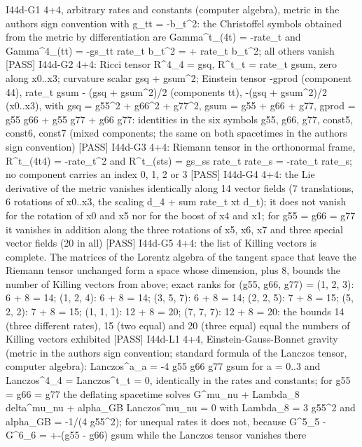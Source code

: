 \documentclass[
  10pt,
]{article}
\newenvironment{Shaded}{}{}
\newcommand{\NormalTok}[1]{#1}
\begin{document}
\begin{Shaded}
\begin{Highlighting}[]
\NormalTok{[PASS] I44d{-}G1  4+4, arbitrary rates and constants (computer algebra), metric in the author\textquotesingle{}s sign convention with g\_tt = {-}b\_t\^{}2: the Christoffel symbols obtained from the metric by differentiation are Gamma\^{}t\_(4t) = {-}rate\_t and Gamma\^{}4\_(tt) = {-}gs\_tt rate\_t b\_t\^{}2 = + rate\_t b\_t\^{}2; all others vanish}
\NormalTok{[PASS] I44d{-}G2  4+4: Ricci tensor R\^{}4\_4 = gsq, R\^{}t\_t = rate\_t gsum, zero along x0..x3; curvature scalar gsq + gsum\^{}2; Einstein tensor {-}gprod (component 44), rate\_t gsum {-} (gsq + gsum\^{}2)/2 (components tt), {-}(gsq + gsum\^{}2)/2 (x0..x3), with gsq = g55\^{}2 + g66\^{}2 + g77\^{}2, gsum = g55 + g66 + g77, gprod = g55 g66 + g55 g77 + g66 g77: identities in the six symbols g55, g66, g77, const5, const6, const7 (mixed components; the same on both spacetimes in the author\textquotesingle{}s sign convention)}
\NormalTok{[PASS] I44d{-}G3  4+4: Riemann tensor in the orthonormal frame, R\^{}t\_(4t4) = {-}rate\_t\^{}2 and R\^{}t\_(sts) = gs\_ss rate\_t rate\_s = {-}rate\_t rate\_s; no component carries an index 0, 1, 2 or 3}
\NormalTok{[PASS] I44d{-}G4  4+4: the Lie derivative of the metric vanishes identically along 14 vector fields (7 translations, 6 rotations of x0..x3, the scaling d\_4 + sum rate\_t xt d\_t); it does not vanish for the rotation of x0 and x5 nor for the boost of x4 and x1; for g55 = g66 = g77 it vanishes in addition along the three rotations of x5, x6, x7 and three special vector fields (20 in all)}
\NormalTok{[PASS] I44d{-}G5  4+4: the list of Killing vectors is complete. The matrices of the Lorentz algebra of the tangent space that leave the Riemann tensor unchanged form a space whose dimension, plus 8, bounds the number of Killing vectors from above; exact ranks for (g55, g66, g77) = (1, 2, 3): 6 + 8 = 14; (1, 2, 4): 6 + 8 = 14; (3, 5, 7): 6 + 8 = 14; (2, 2, 5): 7 + 8 = 15; (5, 2, 2): 7 + 8 = 15; (1, 1, 1): 12 + 8 = 20; (7, 7, 7): 12 + 8 = 20: the bounds 14 (three different rates), 15 (two equal) and 20 (three equal) equal the numbers of Killing vectors exhibited}
\NormalTok{[PASS] I44d{-}L1  4+4, Einstein{-}Gauss{-}Bonnet gravity (metric in the author\textquotesingle{}s sign convention; standard formula of the Lanczos tensor, computer algebra): Lanczos\^{}a\_a = {-}4 g55 g66 g77 gsum for a = 0..3 and Lanczos\^{}4\_4 = Lanczos\^{}t\_t = 0, identically in the rates and constants; for g55 = g66 = g77 the deflating spacetime solves G\^{}mu\_nu + Lambda\_8 delta\^{}mu\_nu + alpha\_GB Lanczos\^{}mu\_nu = 0 with Lambda\_8 = 3 g55\^{}2 and alpha\_GB = {-}1/(4 g55\^{}2); for unequal rates it does not, because G\^{}5\_5 {-} G\^{}6\_6 = +{-}(g55 {-} g66) gsum while the Lanczos tensor vanishes there}

\end{Highlighting}
\end{Shaded}
\end{document}
